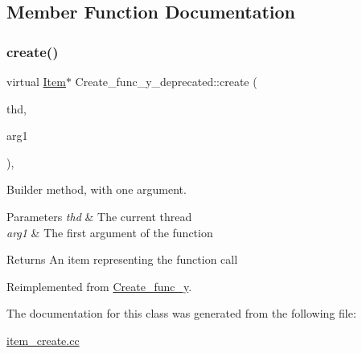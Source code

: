 \subsection{Member Function Documentation}
\mbox{\label{classCreate__func__y__deprecated_a0321bced52d2aeb8efaec4648937fb43}} 
\subsubsection{\texorpdfstring{create()}{create()}}
{\footnotesize\ttfamily virtual \mbox{\hyperlink{classItem}{Item}}$\ast$ Create\+\_\+func\+\_\+y\+\_\+deprecated\+::create (\begin{DoxyParamCaption}\item[{T\+HD $\ast$}]{thd,  }\item[{\mbox{\hyperlink{classItem}{Item}} $\ast$}]{arg1 }\end{DoxyParamCaption})\hspace{0.3cm}{\ttfamily [inline]}, {\ttfamily [virtual]}}

Builder method, with one argument. 
\begin{DoxyParams}{Parameters}
{\em thd} & The current thread \\
\hline
{\em arg1} & The first argument of the function \\
\hline
\end{DoxyParams}
\begin{DoxyReturn}{Returns}
An item representing the function call 
\end{DoxyReturn}


Reimplemented from \mbox{\hyperlink{classCreate__func__y_a2b7dc1551bdf7d0a6cb804c1aef910f7}{Create\+\_\+func\+\_\+y}}.



The documentation for this class was generated from the following file\+:\begin{DoxyCompactItemize}
\item 
\mbox{\hyperlink{item__create_8cc}{item\+\_\+create.\+cc}}\end{DoxyCompactItemize}
